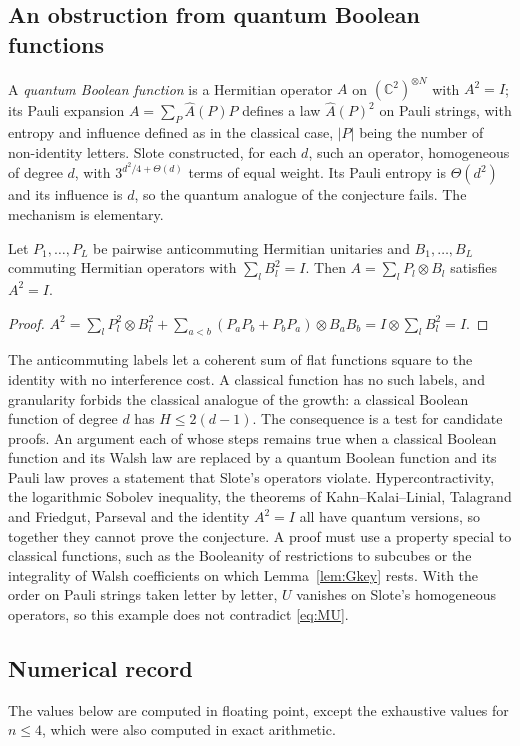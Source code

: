 \subsection{An obstruction from quantum Boolean functions}
A \emph{quantum Boolean function} is a Hermitian operator $A$ on $(\mathbb C^2)^{\otimes N}$ with $A^2=I$; its Pauli expansion $A=\sum_P\hat A(P)P$ defines a law $\hat A(P)^2$ on Pauli strings, with entropy and influence defined as in the classical case, $|P|$ being the number of non-identity letters. Slote \cite{Slote2026} constructed, for each $d$, such an operator, homogeneous of degree $d$, with $3^{d^2/4+\Theta(d)}$ terms of equal weight. Its Pauli entropy is $\Theta(d^2)$ and its influence is $d$, so the quantum analogue of the conjecture fails. The mechanism is elementary.

\begin{proposition}\label{prop:anticommute}
Let $P_1,\dots,P_L$ be pairwise anticommuting Hermitian unitaries and $B_1,\dots,B_L$ commuting Hermitian operators with $\sum_lB_l^2=I$. Then $A=\sum_lP_l\otimes B_l$ satisfies $A^2=I$.
\end{proposition}

\begin{proof}
$A^2=\sum_lP_l^2\otimes B_l^2+\sum_{a<b}(P_aP_b+P_bP_a)\otimes B_aB_b=I\otimes\sum_lB_l^2=I$.
\end{proof}

The anticommuting labels let a coherent sum of flat functions square to the identity with no interference cost. A classical function has no such labels, and granularity forbids the classical analogue of the growth: a classical Boolean function of degree $d$ has $H\le2(d-1)$. The consequence is a test for candidate proofs. An argument each of whose steps remains true when a classical Boolean function and its Walsh law are replaced by a quantum Boolean function and its Pauli law proves a statement that Slote's operators violate. Hypercontractivity, the logarithmic Sobolev inequality, the theorems of Kahn--Kalai--Linial, Talagrand and Friedgut, Parseval and the identity $A^2=I$ all have quantum versions, so together they cannot prove the conjecture. A proof must use a property special to classical functions, such as the Booleanity of restrictions to subcubes or the integrality of Walsh coefficients on which Lemma~\ref{lem:Gkey} rests. With the order on Pauli strings taken letter by letter, $U$ vanishes on Slote's homogeneous operators, so this example does not contradict \eqref{eq:MU}.

\subsection{Numerical record}\label{subsec:fei-numerics}
The values below are computed in floating point, except the exhaustive values for $n\le4$, which were also computed in exact arithmetic.

